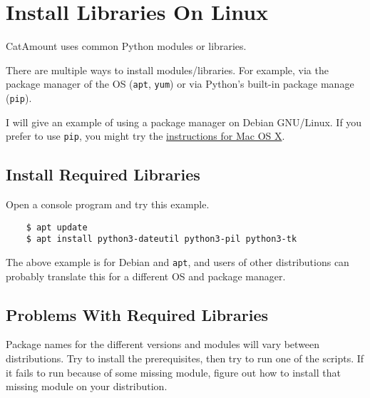 \chapter{Install Libraries On Linux}
\hypertarget{linux-install-libraries}{}

CatAmount uses common Python modules or libraries.

There are multiple ways to install modules/libraries. For example, via
the package manager of the OS (\texttt{apt}, \texttt{yum}) or via
Python's built-in package manage (\texttt{pip}).

I will give an example of using a package manager on Debian GNU/Linux.
If you prefer to use \texttt{pip}, you might try the
\hyperlink{macosx-install-libraries}{instructions for Mac OS X}.

\section{Install Required Libraries}

Open a console program and try this example.

\begin{verbatim}
    $ apt update
    $ apt install python3-dateutil python3-pil python3-tk
\end{verbatim}

The above example is for Debian and \texttt{apt}, and users of other
distributions can probably translate this for a different OS and
package manager.

\section{Problems With Required Libraries}

Package names for the different versions and modules will vary between
distributions. Try to install the prerequisites, then try to run one
of the scripts. If it fails to run because of some missing module, figure
out how to install that missing module on your distribution.

